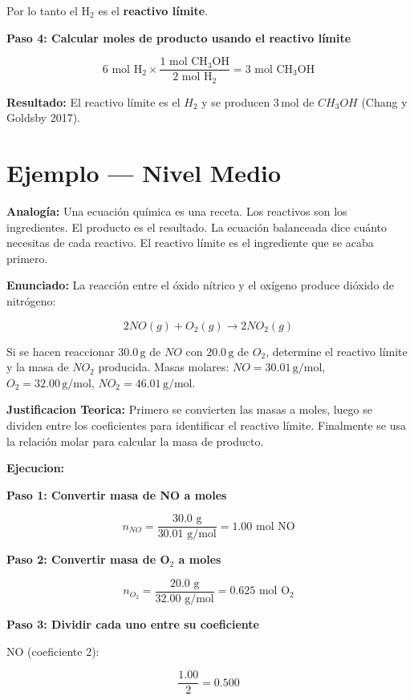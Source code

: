 \documentclass[
  spanish,
  letterpaper,
  12pt,
  oneside,
  open=any]{scrbook}
\newcommand{\setcolorsection}[2]{%
  \definecolor{currentsectionbg}{HTML}{#1}%
  \definecolor{currentsectionborder}{HTML}{#2}%
}
\begin{document}
Por lo tanto el H\(_2\) es el \textbf{reactivo límite}.

\textbf{Paso 4: Calcular moles de producto usando el reactivo límite}

\[6 \text{ mol H}_2 \times \frac{1 \text{ mol CH}_3\text{OH}}{2 \text{ mol H}_2} = 3 \text{ mol CH}_3\text{OH}\]

\textbf{Resultado:} El reactivo límite es el \(H_2\) y se producen
\(3\,\text{mol}\) de \(CH_3OH\) (Chang y Goldsby 2017).

\setcolorsection{b3d9f0}{94c4e0}

\section{Ejemplo --- Nivel Medio}\label{ejemplo-nivel-medio}

\textbf{Analogía:} Una ecuación química es una receta. Los reactivos son
los ingredientes. El producto es el resultado. La ecuación balanceada
dice cuánto necesitas de cada reactivo. El reactivo límite es el
ingrediente que se acaba primero.

\textbf{Enunciado:} La reacción entre el óxido nítrico y el oxígeno
produce dióxido de nitrógeno:

\[2NO(g) + O_2(g) \rightarrow 2NO_2(g)\]

Si se hacen reaccionar \(30.0\,\text{g}\) de \(NO\) con
\(20.0\,\text{g}\) de \(O_2\), determine el reactivo límite y la masa de
\(NO_2\) producida. Masas molares: \(NO = 30.01\,\text{g/mol}\),
\(O_2 = 32.00\,\text{g/mol}\), \(NO_2 = 46.01\,\text{g/mol}\).

\textbf{Justificacion Teorica:} Primero se convierten las masas a moles,
luego se dividen entre los coeficientes para identificar el reactivo
límite. Finalmente se usa la relación molar para calcular la masa de
producto.

\textbf{Ejecucion:}

\textbf{Paso 1: Convertir masa de NO a moles}

\[n_{NO} = \frac{30.0 \text{ g}}{30.01 \text{ g/mol}} = 1.00 \text{ mol NO}\]

\textbf{Paso 2: Convertir masa de O\(_2\) a moles}

\[n_{O_2} = \frac{20.0 \text{ g}}{32.00 \text{ g/mol}} = 0.625 \text{ mol O}_2\]

\textbf{Paso 3: Dividir cada uno entre su coeficiente}

NO (coeficiente 2):

\[\frac{1.00}{2} = 0.500\]
\end{document}
